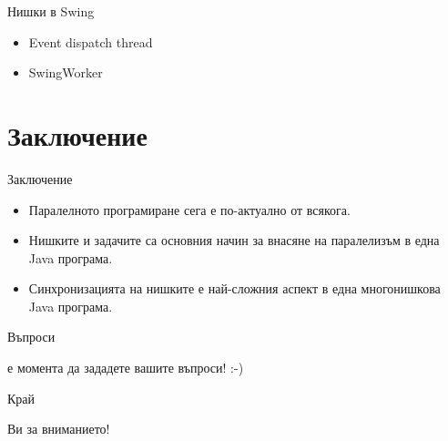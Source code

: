 \documentclass{beamer}
\begin{document}
\begin{frame}{Нишки в Swing}
  \transdissolve
  \begin{itemize}
  \item Event dispatch thread
  \item SwingWorker
  \end{itemize}
\end{frame}


\section*{Заключение}

\begin{frame}{Заключение}
  \transdissolve
  \begin{itemize}
  \item
    Паралелното програмиране сега е по-актуално от всякога.
  \item
    Нишките и задачите са основния начин за внасяне на паралелизъм в
    една Java програма.
  \item
    Синхронизацията на нишките е най-сложния аспект в една
    многонишкова Java програма.
  \end{itemize}
\end{frame}

\begin{frame}{Въпроси}
  \transdissolve
  \begin{center}
     е момента да зададете вашите въпроси! :-)
  \end{center}
\end{frame}

\begin{frame}{Край}
  \transdissolve
  \begin{center}
     Ви за вниманието!
  \end{center}
\end{frame}
\end{document}

